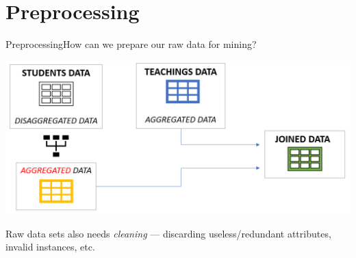 \section{Preprocessing}

\begin{frame}{Preprocessing}{How can we prepare our raw data for mining?}

    \vspace{0.5cm}
    \begin{centering}
        \hspace*{-0.5cm}\includegraphics[scale=0.27]{img5.png}
    \end{centering}

    Raw data sets also needs \emph{cleaning} --- discarding useless/redundant attributes, invalid instances, etc.

\end{frame}

